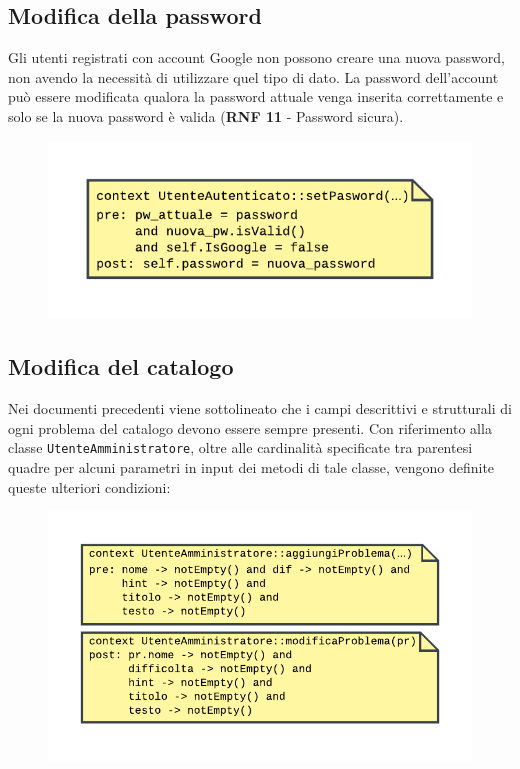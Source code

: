 \documentclass[11pt, a4paper]{article}
\theoremstyle{definition} %
\begin{document}
\subsection{Modifica della password}
Gli utenti registrati con account Google non possono creare una nuova
password, non avendo la necessità di utilizzare quel tipo di dato.
La password dell'account può essere modificata qualora la password
attuale venga inserita correttamente e solo se la nuova password
è valida (\textbf{RNF 11} - Password sicura).

\begin{figure}[H]
\centering
\includegraphics[scale = 1.1]{materiale/ocl-newpassword.pdf}
\end{figure}

\subsection{Modifica del catalogo}
Nei documenti precedenti viene sottolineato che i campi descrittivi e
strutturali di ogni problema del catalogo devono essere sempre presenti.
Con riferimento alla classe \texttt{UtenteAmministratore}, oltre alle
cardinalità specificate tra parentesi quadre per alcuni parametri in input
dei metodi di tale classe, vengono
definite queste ulteriori condizioni:
\begin{figure}[H]
\centering
\includegraphics[scale = 1]{materiale/ocl-amministratore.pdf}
\end{figure}
\end{document}
